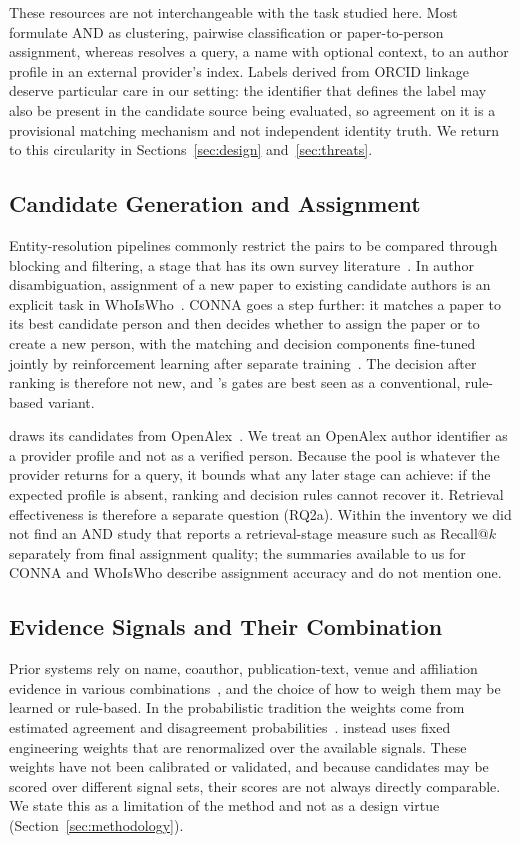 These resources are not interchangeable with the task studied here. Most formulate AND as clustering, pairwise classification or paper-to-person assignment, whereas \hammer{} resolves a query, a name with optional context, to an author profile in an external provider's index. Labels derived from ORCID linkage deserve particular care in our setting: the identifier that defines the label may also be present in the candidate source being evaluated, so agreement on it is a provisional matching mechanism and not independent identity truth. We return to this circularity in Sections~\ref{sec:design} and~\ref{sec:threats}.

\subsection{Candidate Generation and Assignment}
Entity-resolution pipelines commonly restrict the pairs to be compared through blocking and filtering, a stage that has its own survey literature~\cite{papadakis2020blocking}. In author disambiguation, assignment of a new paper to existing candidate authors is an explicit task in WhoIsWho~\cite{chen2023whoiswho}. CONNA goes a step further: it matches a paper to its best candidate person and then decides whether to assign the paper or to create a new person, with the matching and decision components fine-tuned jointly by reinforcement learning after separate training~\cite{chen2020conna}. The decision after ranking is therefore not new, and \hammer{}'s gates are best seen as a conventional, rule-based variant.

\hammer{} draws its candidates from OpenAlex~\cite{priem2022openalex}. We treat an OpenAlex author identifier as a provider profile and not as a verified person. Because the pool is whatever the provider returns for a query, it bounds what any later stage can achieve: if the expected profile is absent, ranking and decision rules cannot recover it. Retrieval effectiveness is therefore a separate question (RQ2a). Within the inventory we did not find an AND study that reports a retrieval-stage measure such as Recall@$k$ separately from final assignment quality; the summaries available to us for CONNA and WhoIsWho describe assignment accuracy and do not mention one.

\subsection{Evidence Signals and Their Combination}
Prior systems rely on name, coauthor, publication-text, venue and affiliation evidence in various combinations~\cite{boukhers2024deepdblp,zhang2021aggand,tian2024pubmedcomputedauthors}, and the choice of how to weigh them may be learned or rule-based. In the probabilistic tradition the weights come from estimated agreement and disagreement probabilities~\cite{fellegi1969recordlinkage,tang2012unified}. \hammer{} instead uses fixed engineering weights that are renormalized over the available signals. These weights have not been calibrated or validated, and because candidates may be scored over different signal sets, their scores are not always directly comparable. We state this as a limitation of the method and not as a design virtue (Section~\ref{sec:methodology}).

